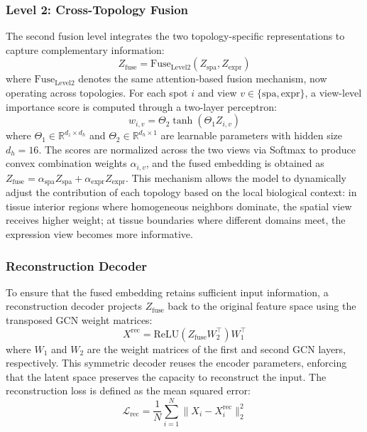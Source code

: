 \documentclass[lettersize,journal]{IEEEtran}
\begin{document}
\subsubsection{Level 2: Cross-Topology Fusion}
The second fusion level integrates the two topology-specific representations to capture complementary information:
\begin{equation}
    Z_{\text{fuse}} = \text{Fuse}_{\text{Level2}}(Z_{\text{spa}}, Z_{\text{expr}})
\end{equation}
where $\text{Fuse}_{\text{Level2}}$ denotes the same attention-based fusion mechanism, now operating across topologies. For each spot $i$ and view $v \in \{\text{spa}, \text{expr}\}$, a view-level importance score is computed through a two-layer perceptron:
\begin{equation}
    w_{i,v} = \Theta_2 \tanh(\Theta_1 Z_{i,v})
\end{equation}
where $\Theta_1 \in \mathbb{R}^{d_z \times d_h}$ and $\Theta_2 \in \mathbb{R}^{d_h \times 1}$ are learnable parameters with hidden size $d_h=16$. The scores are normalized across the two views via Softmax to produce convex combination weights $\alpha_{i,v}$, and the fused embedding is obtained as $Z_{\text{fuse}} = \alpha_{\text{spa}} Z_{\text{spa}} + \alpha_{\text{expr}} Z_{\text{expr}}$. This mechanism allows the model to dynamically adjust the contribution of each topology based on the local biological context: in tissue interior regions where homogeneous neighbors dominate, the spatial view receives higher weight; at tissue boundaries where different domains meet, the expression view becomes more informative.

\subsubsection{Reconstruction Decoder}
To ensure that the fused embedding retains sufficient input information, a reconstruction decoder projects $Z_{\text{fuse}}$ back to the original feature space using the transposed GCN weight matrices:
\begin{equation}
    X^{\text{rec}} = \text{ReLU}(Z_{\text{fuse}} W_2^\top) W_1^\top
\end{equation}
where $W_1$ and $W_2$ are the weight matrices of the first and second GCN layers, respectively. This symmetric decoder reuses the encoder parameters, enforcing that the latent space preserves the capacity to reconstruct the input. The reconstruction loss is defined as the mean squared error:
\begin{equation}
    \mathcal{L}_{\text{rec}} = \frac{1}{N} \sum_{i=1}^{N} \| X_i - X_i^{\text{rec}} \|_2^2
\end{equation}
\end{document}
